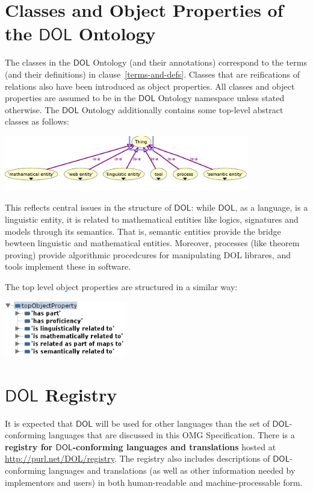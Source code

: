 \documentclass[10pt,fleqn,final]{scrreprt}
\newcommand*{\termref}[1]{\index{#1}#1\xspace}
\newcommand*{\IS}{OMG Specification\xspace}
\newcommand*{\DOL}{\ensuremath{\mathsf{DOL}}\xspace}
\newcommand{\clauserefname}{clause}
\newcommand{\cref}[1]{\clauserefname~\ref{#1}}
\newenvironment{definitions}[0]{\medskip }{}
\begin{document}
\begin{definitions}
\section{Classes and Object Properties of the \DOL Ontology}\label{a:dol-onto-tables}


The classes in the \DOL Ontology (and their annotations) correspond to the terms (and their definitions) in \cref{terms-and-defs}. Classes that are reifications of relations also have been introduced as object properties.  All classes and object properties are assumed to be in the \DOL Ontology namespace unless stated otherwise. 
The \DOL Ontology additionally contains some top-level abstract classes
as follows:

\includegraphics[width=0.8\textwidth]{illustrations/dol-onto-classes.png}

This reflects central issues in the structure of \DOL:
while \DOL, as a language, is a linguistic entity, it is
related to mathematical entities like logics, signatures and models
through its semantics. That is, semantic entities provide the
bridge bewteen linguistic and mathematical entities.
Moreover, processes (like theorem proving) provide algorithmic
procedcures for manipulating DOL librares, and tools implement
these in software.

The top level object properties are structured in a similar way:
\medskip

\includegraphics[width=0.4\textwidth]{illustrations/dol-onto-properties.png}




\section{\DOL Registry}\label{a:registry}

It is expected that \DOL will be used for other languages than the  set of \DOL-conforming
languages that are discussed in this \IS. There is a  \textbf{\termref{registry} for \DOL-conforming languages and translations} hosted
at \url{http://purl.net/DOL/registry}.  The registry  also includes descriptions of
\DOL-conforming languages and translations (as well as other information needed by implementors
and users) in both human-readable and machine-processable form.  


\end{definitions}
\end{document}
